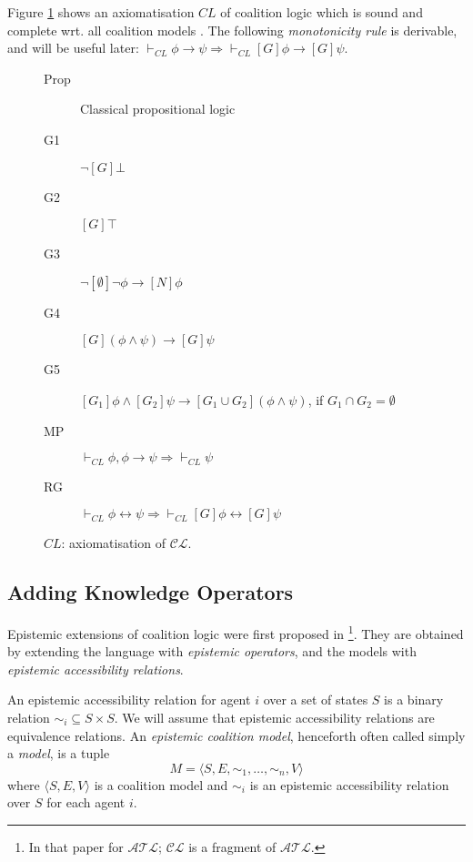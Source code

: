 \documentclass{article}
\newcommand{\acro}[1]{\ensuremath{\mathcal{#1}}}
\newcommand{\tuple}[1]{\langle #1\rangle}
\newcommand{\coal}[1]{[#1]}
\begin{document}
Figure \ref{fig:cl-ax} shows an axiomatisation $CL$ of coalition logic
which is sound and complete wrt. all coalition models
\cite{pauly:2002a}. The following \emph{monotonicity rule} is
derivable, and will be useful later: $\vdash_{CL} \phi \rightarrow
\psi \Rightarrow \vdash_{CL} \coal{G}\phi \rightarrow \coal{G}\psi$.
\begin{figure}[h]
  \centering
\begin{description}
\item[Prop] Classical propositional logic
\item[G1] $\neg [G] \bot$
\item[G2] $[G] \top$
\item[G3] $\neg [\emptyset] \neg \phi \rightarrow [N] \phi$
\item[G4] $[G] (\phi \wedge \psi) \rightarrow [G] \psi$
\item[G5] $[G_1]\phi \wedge [G_2]\psi \rightarrow [G_1 \cup G_2] (\phi \wedge \psi)$, if $G_1 \cap G_2 = \emptyset$
\item[MP] $\vdash_{CL} \phi, \phi \rightarrow \psi \Rightarrow \vdash_{CL}  \psi$
\item[RG] $\vdash_{CL} \phi \leftrightarrow \psi \Rightarrow \vdash_{CL} [G] \phi \leftrightarrow [G] \psi $
\end{description}
  \caption{$CL$: axiomatisation of \acro{CL}.}
  \label{fig:cl-ax}
\end{figure}


\subsection{Adding Knowledge Operators}

Epistemic extensions of coalition logic were first proposed in
\cite{Hoek2003a}\footnote{In that paper for \acro{ATL}; \acro{CL} is a
  fragment of \acro{ATL}.}. They are obtained by extending the
language with \emph{epistemic operators}, and the models with
\emph{epistemic accessibility relations}.

An epistemic accessibility relation for agent $i$ over a set of states
$S$ is a binary relation $\sim_i \subseteq S \times S$. We will assume
that epistemic accessibility relations are equivalence relations. An
\emph{epistemic coalition model}, henceforth often called simply a
\emph{model}, is a tuple
\[M = \tuple{S,E,\sim_1,\ldots,\sim_n,V}\] where $\tuple{S,E,V}$ is a
coalition model and $\sim_i$ is an epistemic accessibility relation
over $S$ for each agent $i$.
\end{document}
